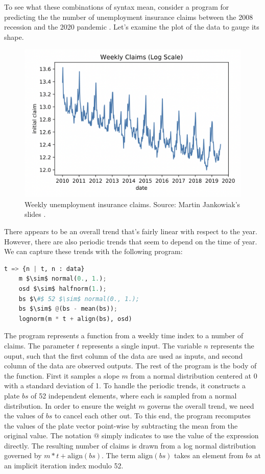 \documentclass[runningheads]{llncs}
\begin{document}
To see what these combinations of syntax mean, consider a program
for predicting the the number of unemployment insurance claims 
between the 2008 recession and the 2020 pandemic \cite{plot}.
Let's examine the plot of the data to gauge its shape.
\newline
\begin{figure}
\includegraphics[scale=0.35]{weekly_claims}

\caption{
Weekly unemployment insurance claims. Source: Martin Jankowiak's slides \cite{plot}.   
}
\end{figure}


There appears to be an overall trend that's fairly linear with respect to the year. 
However, there are also periodic trends that seem to depend on the time of year.  
We can capture these trends with the following program:

\begin{lstlisting}[language=Python]
t => {n | t, n : data}
    m $\sim$ normal(0., 1.); 
    osd $\sim$ halfnorm(1.); 
    bs $\#$ 52 $\sim$ normal(0., 1.); 
    bs $\sim$ @(bs - mean(bs));
    lognorm(m * t + align(bs), osd)
\end{lstlisting}

The program represents a function from a weekly time index to a number of claims.
The parameter $t$ represents a single input. The variable $n$ represents
the ouput, such that the first column of the data are used as inputs, 
and second column of the data are observed outputs.
The rest of the program is the body of the function.
First it samples a slope $m$ from a normal distribution centered at 0 with 
a standard deviation of 1. To handle the periodic trends, it constructs
a plate $bs$ of 52 independent elements, where each is sampled from 
a normal distribution. In order to ensure the weight $m$ governs
the overall trend, we need the values of $bs$ to cancel each other out.
To this end, the program recomputes the values of the plate vector point-wise 
by subtracting the mean from the original value. The notation $@$ simply indicates
to use the value of the expression directly.
The resulting number of claims is drawn from a log normal distribution
governed by $m * t + \text{align}(bs)$. The term $\text{align}(bs)$ takes an element from $bs$ 
at an implicit iteration index modulo 52. 
\end{document}
